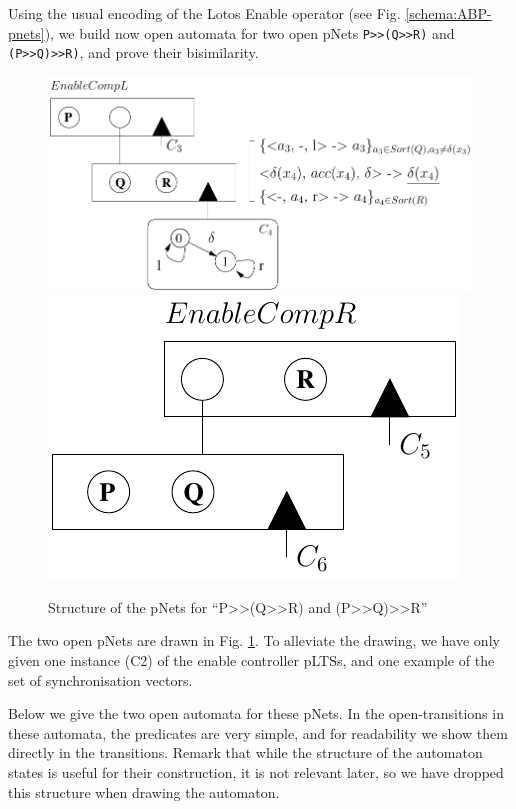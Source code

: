 \documentclass{lncs/llncs}
\begin{document}
Using the usual encoding of the Lotos Enable operator (see
Fig. \ref{schema:ABP-pnets}), we build now open automata for two  
open pNets \texttt{P>>(Q>>R)} and \texttt{(P>>Q)>>R)}, and 
prove their bisimilarity.
\begin{figure}[t]
\centerline{ %
  \includegraphics[width=0.60\linewidth]{XFIG/P-QR}
  \hspace{5mm}
 \includegraphics[width=0.27\linewidth]{XFIG/PQ-R}}
  \caption{Structure of the pNets for ``P>>(Q>>R) and (P>>Q)>>R''}
  \label{schema:enable-assoc}
\end{figure}

The two open pNets are drawn in Fig. \ref{schema:enable-assoc}. To
alleviate the drawing, we have only 
  given one instance (C2) of the enable controller pLTSs, and one example of
  the set of synchronisation vectors.

  Below we give the two open automata for these pNets. In the
  open-transitions in these 
    automata, the predicates are very simple, and for readability
    we show them directly in the transitions.
    Remark that while the structure of the automaton states is useful
    for their construction, it is not relevant later, so we have
    dropped this structure when drawing the automaton.
\end{document}
